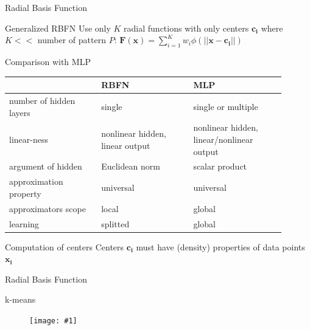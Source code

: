 \documentclass[9pt,t]{beamer}
\newcommand{\picEqHereWidth}[2] { %
    \begin{figure}[htp] 
        \centering
        \texttt{[image: \#1]}
    \end{figure}
}
\begin{document}
\begin{frame}{Radial Basis Function}
    \begin{alertblock}{Generalized RBFN}
        Use only $ K $ radial functions with only centers $ \mathbf{c_i} $ where $ K << $ number of pattern $ P $: $ \mathbf{F(x)} = \sum_{i=1}^{K}w_i\phi(||\mathbf{x}-\mathbf{c_i}||) $
    \end{alertblock}
    \begin{alertblock}{Comparison with MLP}
        \centering
        \begin{tabular}{p{0.3\linewidth} p{0.3\linewidth}p{0.3\linewidth}}
            & RBFN & MLP \\
            \hline
            number of hidden layers & single & single or multiple \\
            linear-ness & nonlinear hidden, linear output & nonlinear hidden, linear/nonlinear output \\
            argument of hidden & Euclidean norm & scalar product \\
            approximation property & universal & universal \\
            approximators scope & local & global \\
            learning & splitted & global
        \end{tabular}
    \end{alertblock}
    \begin{alertblock}{Computation of centers}
        Centers $ \mathbf{c_i} $ must have (density) properties of data points $ \mathbf{x_i} $
    \end{alertblock}
\end{frame}

\begin{frame}{Radial Basis Function}
    \begin{alertblock}{k-means}
        \picEqHereWidth{rbfn_kmeans}{\linewidth}
    \end{alertblock}
\end{frame}

\end{document}
